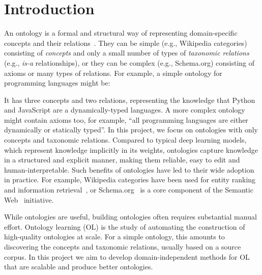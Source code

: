 \chapter{Introduction}

\label{firstcontentpage} %

An ontology is a formal and structural way of representing domain-specific concepts and their relations~\cite{gruber1995toward}.
They can be simple (e.g., Wikipedia categories) consisting of \emph{concepts} and only a small number of types of \emph{taxonomic relations} (e.g., \emph{is-a} relationships), or they can be complex (e.g., Schema.org) consisting of axioms or many types of relations. For example, a simple ontology for programming languages might be:

\begin{figure}[H]
    \centering
    \sffamily
    \newcommand{\dist}{1.5cm}
\end{figure}

It has three concepts and two relations, representing the knowledge that Python and JavaScript are a dynamically-typed languages. A more complex ontology might contain axioms too, for example, ``all programming languages are either dynamically or statically typed''.
In this project, we focus on ontologies with only concepts and taxonomic relations. Compared to typical deep learning models, which represent knowledge implicitly in its weights, ontologies capture knowledge in a structured and explicit manner, making them reliable, easy to edit and human-interpretable. Such benefits of ontologies have led to their wide adoption in practice. For example, Wikipedia categories have been used for entity ranking~\cite{vercoustre2008using} and information retrieval~\cite{sorg2012exploiting}, or Schema.org~\cite{Schema.org_2011} is a core component of the Semantic Web~\cite{antoniou2004semantic} initiative.

While ontologies are useful, building ontologies often requires substantial manual effort. Ontology learning (OL) is the study of automating the construction of high-quality ontologies at scale. For a simple ontology, this amounts to discovering the concepts and taxonomic relations, usually based on a source corpus. In this project we aim to develop domain-independent methods for OL that are scalable and produce better ontologies.

